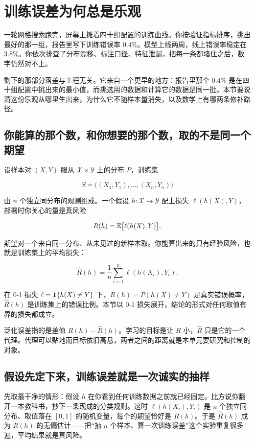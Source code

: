\section{训练误差为何总是乐观}
\label{sec:13-Machine-Learning/10-Learning-Theory/01}

一轮网格搜索跑完，屏幕上摊着四十组配置的训练曲线。你按验证指标排序，挑出最好的那一组，报告里写下训练错误率 \(0.4\%\)。模型上线两周，线上错误率稳定在 \(3.8\%\)。你依次排查了分布漂移、标注口径、特征泄漏，把每一条都堵住之后，数字仍然对不上。

剩下的那部分落差与工程无关。它来自一个更早的地方：报告里那个 \(0.4\%\) 是在四十组配置中挑出来的最小值，而挑选用的数据和计算它的数据是同一批。本节要说清这份乐观从哪里生出来，为什么它不随样本量消失，以及数学上有哪两条修补路径。

\subsection{你能算的那个数，和你想要的那个数，取的不是同一个期望}

设样本对 \((X, Y)\) 服从 \(\mathcal{X} \times \mathcal{Y}\) 上的分布 \(P\)，训练集

\[
S = \bigl((X_1, Y_1), \dots, (X_n, Y_n)\bigr)
\]

由 \(n\) 个独立同分布的观测组成。一个假设 \(h: \mathcal{X} \to \mathcal{Y}\) 配上损失 \(\ell(h(X), Y)\)，部署时你关心的量是真风险

\[
R(h) = \mathbb{E}\bigl[\ell(h(X), Y)\bigr],
\]

期望对一个来自同一分布、从未见过的新样本取。你能算出来的只有经验风险，也就是训练集上的平均损失：

\[
\widehat R(h) = \frac{1}{n} \sum_{i=1}^{n} \ell(h(X_i), Y_i).
\]

在 0-1 损失 \(\ell = \mathbf{1}\{h(X) \ne Y\}\) 下，\(R(h) = P(h(X) \ne Y)\) 是真实错误概率，\(\widehat R(h)\) 是训练集上的错误比例。本节以 0-1 损失展开，结论的形式对任何取值有界的损失都成立。

泛化误差指的是差值 \(R(h) - \widehat R(h)\)。学习的目标是让 \(R\) 小，\(\widehat R\) 只是它的一个代理。代理可以贴地而目标依旧高悬，两者之间的距离就是本单元要研究和控制的对象。

\subsection{假设先定下来，训练误差就是一次诚实的抽样}

先取最干净的情形：假设 \(h\) 在你看到任何训练数据之前就已经固定。比方说你翻开一本教科书，抄下一条现成的分类规则。这时 \(\ell(h(X_i), Y_i)\) 是 \(n\) 个独立同分布、取值落在 \([0,1]\) 的随机变量，每个的期望恰好是 \(R(h)\)。于是 \(\widehat R(h)\) 成为 \(R(h)\) 的无偏估计——把``抽 \(n\) 个样本、算一次训练误差''这个实验重复很多遍，平均结果就是真风险。

